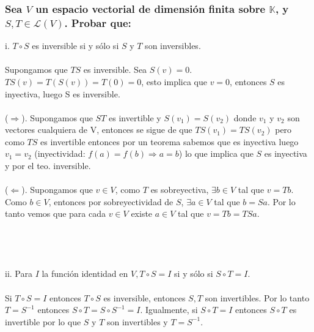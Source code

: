 \documentclass{article}
\begin{document}
\subsubsection{Sea $V$ un espacio vectorial de dimensión finita sobre $\mathbb{K}$, y $S,T \in \mathcal{L}(V)$.
Probar que:}
i. $T \circ S$ es inversible si y sólo si $S$ y $T$ son inversibles. \\
\\
Supongamos que $TS$ es inversible. Sea $S(v) = 0$. $TS(v) = T(S(v)) = T(0) = 0$, esto implica que $v = 0$, entonces
$S$ es inyectiva, luego S es inversible. 
\\ \\
($\Rightarrow$). Supongamos que $ST$ es invertible y $S(v_1)=S(v_2)$ donde $v_1$ y $v_2$ son vectores
cualquiera de V, entonces se sigue de que $TS(v_1)=TS(v_2)$ pero como $TS$ es invertible entonces por un teorema
sabemos que es inyectiva luego $v_1 = v_2$ (inyectividad: $f(a)=f(b) \Rightarrow a=b$) lo que implica que 
$S$ es inyectiva y por el teo. inversible. \\ \\
($\Leftarrow$). Supongamos que $v \in V$, como $T$ es sobreyectiva, $\exists b \in V$ tal que $v = Tb$. Como
$b \in V$, entonces por sobreyectividad de $S$, $\exists a \in V$ tal que $b = Sa$. Por lo tanto vemos que
para cada $v \in V$ existe $a \in V$ tal que $v = Tb = TSa$. \\
\\ \\ \\ \\ 
ii. Para $I$ la función identidad en $V,T \circ S = I$ si y sólo si $S \circ T = I$. \\
\\
Si $T \circ S = I$ entonces $T \circ S$ es inversible, entonces $S,T$ son invertibles. Por lo tanto $T = S^{-1}$
entonces $S \circ T = S \circ S^{-1} = I$. Igualmente, si $S \circ T = I$ entonces $S \circ T$ es invertible 
por lo que $S$ y $T$ son invertibles y $T=S^{-1}$.
\end{document}
